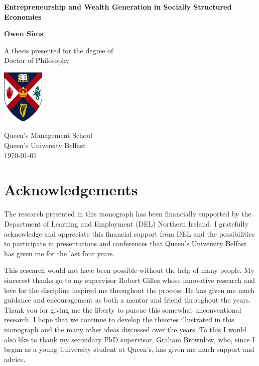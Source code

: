 \documentclass[11pt,fleqn]{book}
\begin{document}
\begin{titlepage}
    \begin{center}
        \vspace*{1cm}

        \huge
        \textbf{Entrepreneurship and Wealth Generation in Socially Structured Economies}

        \vspace{1.5cm}

        \Large
        \textbf{Owen Sims}

        \vfill

        \large
        A thesis presented for the degree of\\
        Doctor of Philosophy

        \vspace{0.8cm}

        \includegraphics[width=0.15\textwidth]{imgs/qublogo2.png}

        \large
        Queen's Management School\\
        Queen's University Belfast\\
        \today

    \end{center}
\end{titlepage}


\thispagestyle{empty}

\newpage

\chapter*{Acknowledgements}

The research presented in this monograph has been financially supported by the Department of Learning and Employment (DEL) Northern Ireland. I gratefully acknowledge and appreciate this financial support from DEL and the possibilities to participate in presentations and conferences that Queen's University Belfast has given me for the last four years.

This research would not have been possible without the help of many people. My sincerest thanks go to my supervisor Robert Gilles whose innovative research and love for the discipline inspired me throughout the process. He has given me much guidance and encouragement as both a mentor and friend throughout the years. Thank you for giving me the liberty to pursue this somewhat unconventional research. I hope that we continue to develop the theories illustrated in this monograph and the many other ideas discussed over the years. To this I would also like to thank my secondary PhD supervisor, Graham Brownlow, who, since I began as a young University student at Queen's, has given me much support and advice.
\end{document}
